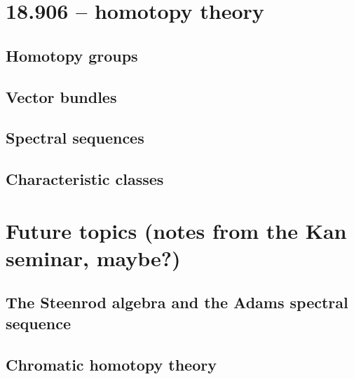 \documentclass{extbook}
\begin{document}
\part{18.906 -- homotopy theory}\label{906}

\chapter{Homotopy groups}














\chapter{Vector bundles}









\chapter{Spectral sequences}











\chapter{Characteristic classes}






\part{Future topics (notes from the Kan seminar, maybe?)}

\chapter{The Steenrod algebra and the Adams spectral sequence}

\chapter{Chromatic homotopy theory}

\newpage
{}
\end{document}
